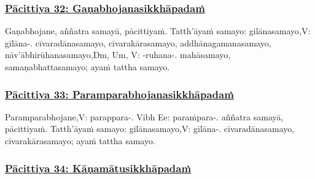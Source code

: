 \subsubsection*{\hyperref[exp32]{Pācittiya 32: Gaṇabhojanasikkhāpadaṁ}}
\label{pac32}

Gaṇabhojane, aññatra samayā, pācittiyaṁ. Tatth'āyaṁ samayo: gilānasamayo,\makeatletter\hyperlink{endnote-appendix}\makeatother V: gīlāna-. cīvaradānasamayo, cīvarakārasamayo, addhānagamanasamayo, nāv'ābhirūhanasamayo,\makeatletter\hyperlink{endnote-appendix}\makeatother Dm, Um, V: -ruhana-. mahāsamayo, samaṇabhattasamayo; ayaṁ tattha samayo.



\subsubsection*{\hyperref[exp33]{Pācittiya 33: Paramparabhojanasikkhāpadaṁ}}
\label{pac33}

Paramparabhojane,\makeatletter\hyperlink{endnote-appendix}\makeatother V: parappara-. Vibh Ee: paraṁpara-. aññatra samayā, pācittiyaṁ. Tatth'āyaṁ samayo: gilānasamayo,\makeatletter\hyperlink{endnote-appendix}\makeatother V: gīlāna-. cīvaradānasamayo, cīvarakārasamayo; ayaṁ tattha samayo.



\subsubsection*{\hyperref[exp34]{Pācittiya 34: Kāṇamātusikkhāpadaṁ}}
\label{pac34}

